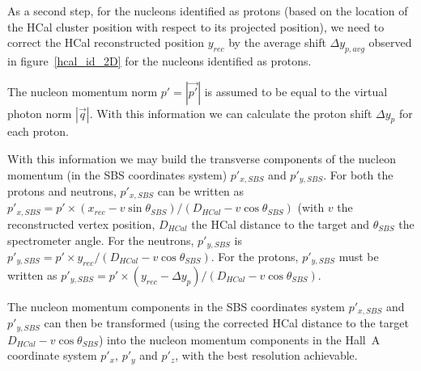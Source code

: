 As a second step, for the nucleons identified as protons (based on the location of the HCal cluster position with respect to its projected position), we need to correct the HCal reconstructed position $y_{rec}$ by the average shift $\Delta y_{p, avg}$ observed in figure~\ref{hcal_id_2D} for the nucleons identified as protons.

The nucleon momentum norm $p' = |\vec{p'}|$ is assumed to be equal to the virtual photon norm $|\vec{q}|$.
With this information we can calculate the proton shift $\Delta y_{p}$ for each proton.

With this information we may build the transverse components of the nucleon momentum (in the SBS coordinates system) $p'_{x, SBS}$ and $p'_{y, SBS}$.
For both the protons and neutrons, $p'_{x, SBS}$ can be written as $p'_{x, SBS} = p' \times (x_{rec}-v\sin{\theta_{SBS}})/(D_{HCal}-v\cos{\theta_{SBS}})$ (with $v$ the reconstructed vertex position, $D_{HCal}$ the HCal distance to the target and $\theta_{SBS}$ the spectrometer angle.
For the neutrons, $p'_{y, SBS}$ is $p'_{y, SBS} = p' \times y_{rec}/(D_{HCal}-v\cos{\theta_{SBS}})$.
For the protons, $p'_{y, SBS}$ must be written as $p'_{y, SBS} = p' \times (y_{rec} - \Delta y_{p})/(D_{HCal}-v\cos{\theta_{SBS}})$.

The nucleon momentum components in the SBS coordinates system $p'_{x, SBS}$ and $p'_{y, SBS}$ can then be transformed (using the corrected HCal distance to the target $D_{HCal}-v\cos{\theta_{SBS}}$) into the nucleon momentum components in the Hall~A coordinate system $p'_{x}$, $p'_y$ and $p'_z$, with the best resolution achievable. 

